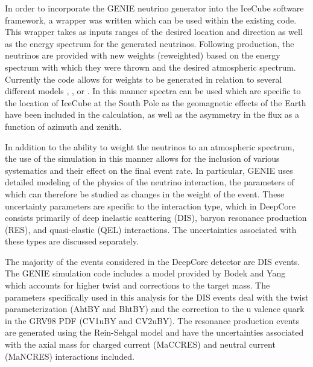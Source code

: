 \documentclass[../Main.tex]{subfiles}
\begin{document}
In order to incorporate the GENIE neutrino generator into the IceCube software framework, a wrapper was written which can be used within the existing code.  This wrapper takes as inputs ranges of the desired location and direction as well as the energy spectrum for the generated neutrinos.  Following production, the neutrinos are provided with new weights (reweighted) based on the energy spectrum with which they were thrown and the desired atmospheric spectrum.  Currently the code allows for weights to be generated in relation to several different models \cite{Honda2015}, \cite{Bartol2004}, or \cite{Fluka2003}.  In this manner spectra can be used which are specific to the location of IceCube at the South Pole as the geomagnetic effects of the Earth have been included in the calculation, as well as the asymmetry in the flux as a function of azimuth and zenith.

In addition to the ability to weight the neutrinos to an atmospheric spectrum, the use of the simulation in this manner allows for the inclusion of various systematics and their effect on the final event rate.  In particular, GENIE uses detailed modeling of the physics of the neutrino interaction, the parameters of which can therefore be studied as changes in the weight of the event.  These uncertainty parameters are specific to the interaction type, which in DeepCore consists primarily of deep inelastic scattering (DIS), baryon resonance production (RES), and quasi-elastic (QEL) interactions.  The uncertainties associated with these types are discussed separately.

The majority of the events considered in the DeepCore detector are DIS events.  The GENIE simulation code includes a model provided by Bodek and Yang \cite{BodekYang} which accounts for higher twist and corrections to the target mass.  The parameters specifically used in this analysis for the DIS events deal with the twist parameterization (AhtBY and BhtBY) and the correction to the u valence quark in the GRV98 PDF (CV1uBY and CV2uBY).  The resonance production events are generated using the Rein-Sehgal model \cite{ReinSehgal} and have the uncertainties associated with the axial mass for charged current (MaCCRES) and neutral current (MaNCRES) interactions included.


\end{document}

